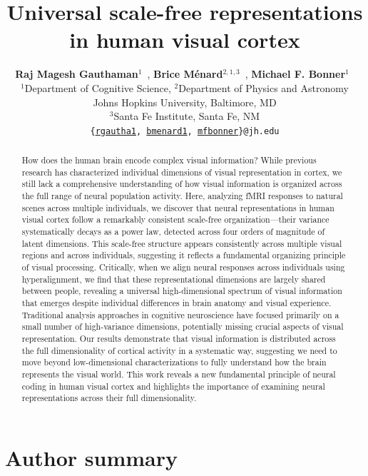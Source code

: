\documentclass[10pt]{article}
\title{Universal scale-free representations\\in human visual cortex}
\author{
    \textbf{Raj Magesh Gauthaman$^1$}~\orcidlink{0000-0001-7121-1532},
    \textbf{Brice Ménard$^{2,1,3}$}~\orcidlink{0000-0003-3164-6974},
    \textbf{Michael F. Bonner$^1$}~\orcidlink{0000-0002-4992-674X}\\
    $^1$Department of Cognitive Science,
    $^2$Department of Physics and Astronomy\\
    Johns Hopkins University, Baltimore, MD\\
    $^3$Santa Fe Institute, Santa Fe, NM\\
    \texttt{\{\href{mailto:rgautha1@jh.edu}{rgautha1}, \href{mailto:bmenard1@jh.edu}{bmenard1}, \href{mailto:mfbonner@jh.edu}{mfbonner}\}@jh.edu}
}
\date{}
\begin{document}
\maketitle

\begin{abstract}
    How does the human brain encode complex visual information? While previous research has characterized individual dimensions of visual representation in cortex, we still lack a comprehensive understanding of how visual information is organized across the full range of neural population activity. Here, analyzing fMRI responses to natural scenes across multiple individuals, we discover that neural representations in human visual cortex follow a remarkably consistent scale-free organization---their variance systematically decays as a power law, detected across four orders of magnitude of latent dimensions. This scale-free structure appears consistently across multiple visual regions and across individuals, suggesting it reflects a fundamental organizing principle of visual processing. Critically, when we align neural responses across individuals using hyperalignment, we find that these representational dimensions are largely shared between people, revealing a universal high-dimensional spectrum of visual information that emerges despite individual differences in brain anatomy and visual experience. Traditional analysis approaches in cognitive neuroscience have focused primarily on a small number of high-variance dimensions, potentially missing crucial aspects of visual representation. Our results demonstrate that visual information is distributed across the full dimensionality of cortical activity in a systematic way, suggesting we need to move beyond low-dimensional characterizations to fully understand how the brain represents the visual world. This work reveals a new fundamental principle of neural coding in human visual cortex and highlights the importance of examining neural representations across their full dimensionality.
\end{abstract}

\section{Author summary}\label{author-summary}
\end{document}
